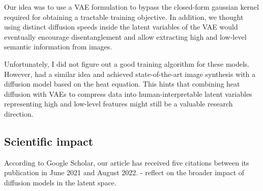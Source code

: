 Our idea was to use a VAE formulation to bypass the closed-form gaussian kernel required for obtaining a tractable training objective. In addition, we thought using distinct diffusion speeds inside the latent variables of the VAE would eventually encourage disentanglement and allow extracting high and low-level semantic information from images.

Unfortunately, I did not figure out a good training algorithm for these models. However, \citet{rissanen2022generative} had a similar idea and achieved state-of-the-art image synthesis with a diffusion model based on the heat equation. This hints that combining heat diffusion with VAEs to compress data into human-interpretable latent variables representing high and low-level features might still be a valuable research direction.

\subsection{Scientific impact}

According to Google Scholar, our article has received five citations between its publication in June 2021 and August 2022.
- reflect on the broader impact of diffusion models in the latent space.

